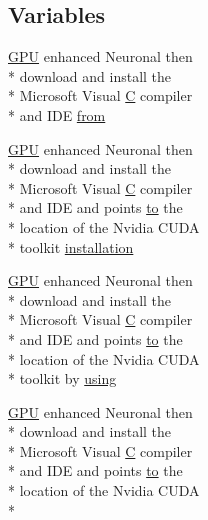 \subsection*{Variables}
\begin{DoxyCompactItemize}
\item 
\hyperlink{modelSpec_8h_a39cb9803524b6f3b783344b2f89867b4}{G\+P\+U} enhanced Neuronal then \\*
download and install the \\*
Microsoft Visual \hyperlink{README_8txt_aacbc294df2c305f93084b177996ed83c}{C} compiler \\*
and I\+D\+E \hyperlink{README_8txt_aa96a977025ecc6f44756d8c7ce4f7674}{from}
\item 
\hyperlink{modelSpec_8h_a39cb9803524b6f3b783344b2f89867b4}{G\+P\+U} enhanced Neuronal then \\*
download and install the \\*
Microsoft Visual \hyperlink{README_8txt_aacbc294df2c305f93084b177996ed83c}{C} compiler \\*
and I\+D\+E and points \hyperlink{README_8txt_add1f2ee32acc15ef77f839d4382c9768}{to} the \\*
location of the Nvidia C\+U\+D\+A \\*
toolkit \hyperlink{README_8txt_a7de61c69397952ab48b198ee4fe495bc}{installation}
\item 
\hyperlink{modelSpec_8h_a39cb9803524b6f3b783344b2f89867b4}{G\+P\+U} enhanced Neuronal then \\*
download and install the \\*
Microsoft Visual \hyperlink{README_8txt_aacbc294df2c305f93084b177996ed83c}{C} compiler \\*
and I\+D\+E and points \hyperlink{README_8txt_add1f2ee32acc15ef77f839d4382c9768}{to} the \\*
location of the Nvidia C\+U\+D\+A \\*
toolkit by \hyperlink{README_8txt_a914e3a56b7351927e7721e0d4168afb5}{using}
\item 
\hyperlink{modelSpec_8h_a39cb9803524b6f3b783344b2f89867b4}{G\+P\+U} enhanced Neuronal then \\*
download and install the \\*
Microsoft Visual \hyperlink{README_8txt_aacbc294df2c305f93084b177996ed83c}{C} compiler \\*
and I\+D\+E and points \hyperlink{README_8txt_add1f2ee32acc15ef77f839d4382c9768}{to} the \\*
location of the Nvidia C\+U\+D\+A \\*

\end{DoxyCompactItemize}
